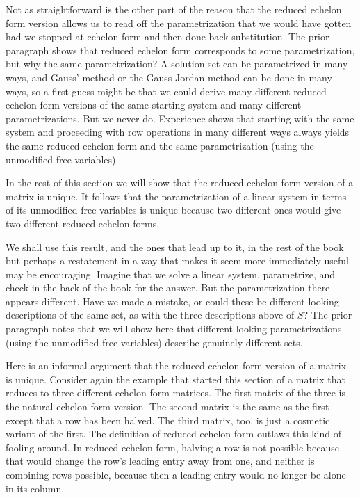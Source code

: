 Not as straightforward is the other 
part of the reason that the reduced echelon form version allows us to
read off the parametrization that we would have gotten had we stopped at
echelon form and then done back substitution.
The prior paragraph shows that reduced echelon form corresponds to some
parametrization, but why the same parametrization?
A solution set can be parametrized in many ways, and Gauss' method
or the Gauss-Jordan method can be done in many ways, so a first guess
might be that we could derive many different reduced echelon form
versions of the same starting system and many different parametrizations.
But we never do.
Experience shows that starting with the same system and  proceeding with row
operations in many different ways always yields the same reduced echelon form
and the same parametrization (using the unmodified free variables).

In the rest 
of this section we will show that the reduced echelon form version
of a matrix is unique.
It follows that the parametrization of a linear system
in terms of its unmodified free variables is unique
because two different ones would give two different reduced echelon forms.

We shall use this result, and the ones that lead up to it, in the rest of
the book but perhaps a restatement in a way that makes it seem more 
immediately useful may be encouraging.
Imagine that we solve a linear system, parametrize, and check in the back of
the book for the answer.
But the parametrization there appears different.
Have we made a mistake, or could these be different-looking
descriptions of the same set, as with the three descriptions above of $S$?
The prior paragraph notes that
we will show here   
that different-looking parametrizations (using the unmodified free
variables) describe genuinely different sets. 

Here is an informal argument that the reduced 
echelon form version of a matrix is unique.
Consider again the example that started this section of a matrix that
reduces to three different echelon form matrices.
The first matrix of the three is the natural echelon form version.
The second matrix is the same as 
the first except that a row has been halved.
The third matrix, too, is just a cosmetic variant of the first. 
The definition of reduced echelon form outlaws this kind of fooling around.
In reduced echelon form,
halving a row is not possible because that would
change the row's leading entry away from one, and
neither is combining rows possible, because then a leading entry would no
longer be alone in its column.

